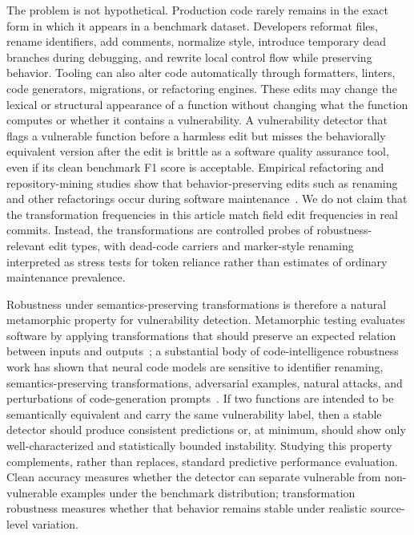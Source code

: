 \documentclass[a4paper,fleqn]{cas-dc}
\begin{document}
The problem is not hypothetical. Production code rarely remains in the exact
form in which it appears in a benchmark dataset. Developers reformat files,
rename identifiers, add comments, normalize style, introduce temporary dead
branches during debugging, and rewrite local control flow while preserving
behavior. Tooling can also alter code automatically through formatters,
linters, code generators, migrations, or refactoring engines. These edits may
change the lexical or structural appearance of a function without changing what
the function computes or whether it contains a vulnerability. A vulnerability
detector that flags a vulnerable function before a harmless edit but misses the
behaviorally equivalent version after the edit is brittle as a software quality
assurance tool, even if its clean benchmark F1 score is acceptable.
Empirical refactoring and repository-mining studies show that
behavior-preserving edits such as renaming and other refactorings occur during software
maintenance~\cite{murphyhill2012refactor,kim2014microsoft,
peruma2018rename}. We do not claim that the transformation frequencies in this
article match field edit frequencies in real commits. Instead, the transformations
are controlled probes of robustness-relevant edit types, with dead-code
carriers and marker-style renaming interpreted as stress tests for token
reliance rather than estimates of ordinary maintenance prevalence.

Robustness under semantics-preserving transformations is therefore a natural
metamorphic property for vulnerability detection. Metamorphic testing evaluates
software by applying transformations that should preserve an expected relation
between inputs and outputs~\cite{chen2018metamorphic}; a substantial body of
code-intelligence robustness work has shown that neural code models are
sensitive to identifier renaming, semantics-preserving transformations,
adversarial examples, natural attacks, and perturbations of code-generation
prompts~\cite{yefet2020adversarial,zhang2020mhm,bielik2020adversarial,
rabin2021generalizability,henkel2022semantic,yang2022alert,zhang2022carrot,
wang2023recode,li2025robustness}. If two functions are
intended to be semantically equivalent and carry the same vulnerability label,
then a stable detector should produce consistent predictions or, at minimum,
should show only well-characterized and statistically bounded instability.
Studying this property complements, rather than replaces, standard predictive
performance evaluation. Clean accuracy measures whether the detector can
separate vulnerable from non-vulnerable examples under the benchmark
distribution; transformation robustness measures whether that behavior remains
stable under realistic source-level variation.
\end{document}
